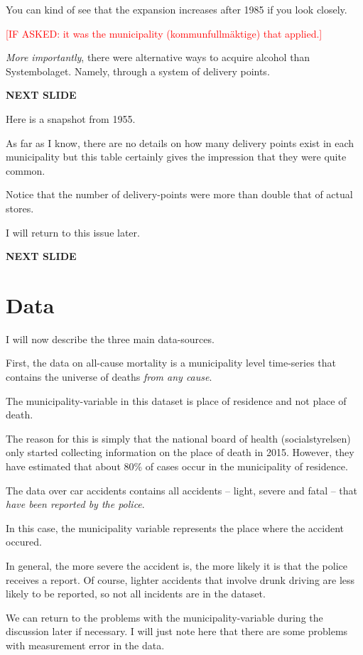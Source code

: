 \documentclass[12pt]{article}
\newcommand{\TODO}[1]{\textcolor{red}{[#1]}}
\begin{document}
 You can kind of see that the expansion increases after 1985 if you look closely.

 \TODO{IF ASKED: it was the municipality (kommunfullmäktige) that applied.}

\emph{More importantly}, there were alternative ways to acquire alcohol than Systembolaget. Namely, through a system of delivery points.

\textbf{NEXT SLIDE}

Here is a snapshot from 1955. 

As far as I know, there are no details on how many delivery points exist in each municipality but this table certainly gives the impression that they were quite common.

Notice that the number of delivery-points were more than double that of actual stores.

I will return to this issue later.

\textbf{NEXT SLIDE}

\section{Data}

I  will now describe the three main data-sources.

First, the data on all-cause mortality is a municipality level time-series that contains the universe of deaths \emph{from any cause}. 

The municipality-variable in this dataset is place of residence and not place of death. 

The reason for this is simply that the national board of health (socialstyrelsen) only started collecting information on the place of death in 2015. However, they have estimated that about 80\% of cases occur in the municipality of residence.

The data over car accidents contains all accidents -- light, severe and fatal -- that \emph{have been reported by the police}. 

In this case, the municipality variable represents the place where the accident occured. 

In general, the more severe the accident is, the more likely it is that the police receives a report. Of course, lighter accidents that involve drunk driving are less likely to be reported, so not all incidents are in the dataset.

We can return to the problems with the municipality-variable during the discussion later if necessary. I will just note here that there are some problems with measurement error in the data.
\end{document}
